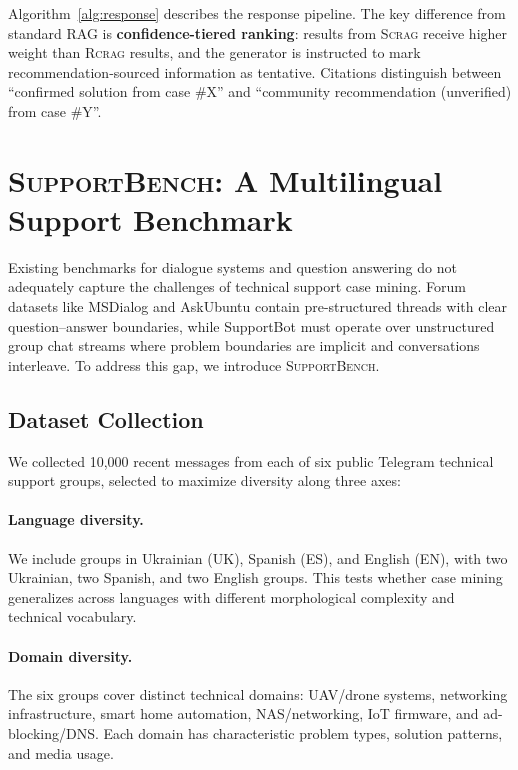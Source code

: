 \documentclass[11pt]{article}
\newcommand{\scrag}{\textsc{Scrag}}
\newcommand{\rcrag}{\textsc{Rcrag}}
\newcommand{\supportbench}{\textsc{SupportBench}}
\begin{document}
Algorithm~\ref{alg:response} describes the response pipeline. The key difference from standard RAG is \textbf{confidence-tiered ranking}: results from \scrag{} receive higher weight than \rcrag{} results, and the generator is instructed to mark recommendation-sourced information as tentative. Citations distinguish between ``confirmed solution from case \#X'' and ``community recommendation (unverified) from case \#Y''.

\section{\supportbench{}: A Multilingual Support Benchmark}
\label{sec:supportbench}

Existing benchmarks for dialogue systems and question answering do not adequately capture the challenges of technical support case mining. Forum datasets like MSDialog \citep{qu2018analyzing} and AskUbuntu \citep{lei2017semi} contain pre-structured threads with clear question--answer boundaries, while SupportBot must operate over unstructured group chat streams where problem boundaries are implicit and conversations interleave. To address this gap, we introduce \supportbench{}.

\subsection{Dataset Collection}

We collected 10{,}000 recent messages from each of six public Telegram technical support groups, selected to maximize diversity along three axes:

\paragraph{Language diversity.} We include groups in Ukrainian (UK), Spanish (ES), and English (EN), with two Ukrainian, two Spanish, and two English groups. This tests whether case mining generalizes across languages with different morphological complexity and technical vocabulary.

\paragraph{Domain diversity.} The six groups cover distinct technical domains: UAV/drone systems, networking infrastructure, smart home automation, NAS/networking, IoT firmware, and ad-blocking/DNS. Each domain has characteristic problem types, solution patterns, and media usage.
\end{document}
